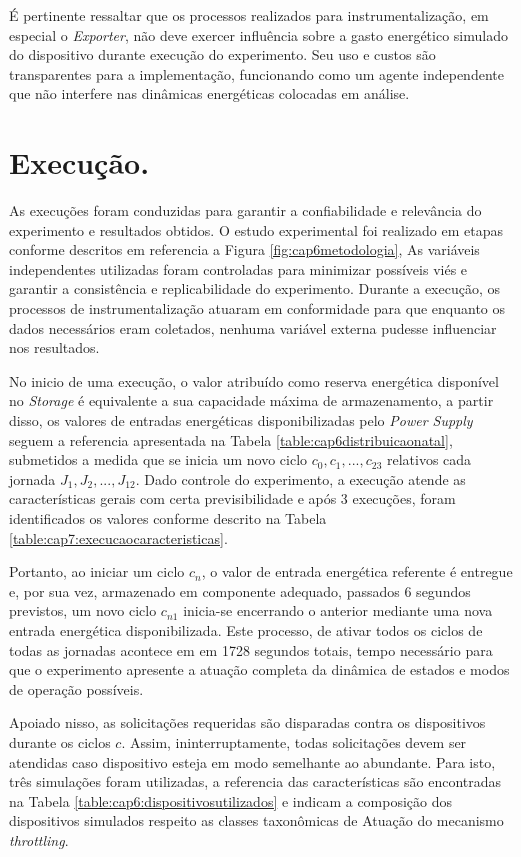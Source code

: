 É pertinente ressaltar que os processos realizados para instrumentalização, em especial o \textit{Exporter}, não deve exercer influência sobre a gasto energético simulado do dispositivo durante execução do experimento. Seu uso e custos são transparentes para a implementação, funcionando como um agente independente que não interfere nas dinâmicas energéticas colocadas em análise.

\section{Execução.}
\label{cap6:execucao}

As execuções foram conduzidas para garantir a confiabilidade e relevância do experimento e resultados obtidos. O estudo experimental foi realizado em etapas conforme descritos em referencia a Figura \ref{fig:cap6metodologia}, As variáveis independentes utilizadas foram controladas para minimizar possíveis viés e garantir a consistência e replicabilidade do experimento. Durante a execução, os processos de instrumentalização atuaram em conformidade para que enquanto os dados necessários eram coletados, nenhuma variável externa pudesse influenciar nos resultados.


No inicio de uma execução, o valor atribuído como reserva energética disponível no \textit{Storage} é equivalente a sua capacidade máxima de armazenamento, a partir disso, os valores de entradas energéticas disponibilizadas pelo \textit{Power Supply} seguem a referencia apresentada na Tabela \ref{table:cap6distribuicaonatal}, submetidos a medida que se inicia um novo ciclo $c_0, c_1,...,c_{23}$ relativos cada jornada $J_1, J_2, ..., J_{12}$. Dado controle do experimento, a execução atende as características gerais com certa previsibilidade e após 3 execuções, foram identificados os valores conforme descrito na Tabela \ref{table:cap7:execucaocaracteristicas}.


Portanto, ao iniciar um ciclo $c_n$, o valor de entrada energética referente é entregue e, por sua vez, armazenado em componente adequado, passados 6 segundos previstos, um novo ciclo $c_{n1}$ inicia-se encerrando o anterior mediante uma nova entrada energética disponibilizada. Este processo, de ativar todos os ciclos de todas as jornadas acontece em em 1728 segundos totais, tempo necessário para que o experimento apresente a atuação completa da dinâmica de estados e modos de operação possíveis.

Apoiado nisso, as solicitações requeridas são disparadas contra os dispositivos durante os ciclos $c$. Assim, ininterruptamente, todas solicitações devem ser atendidas caso dispositivo esteja em modo semelhante ao abundante. Para isto, três simulações foram utilizadas, a referencia das características são encontradas na Tabela \ref{table:cap6:dispositivosutilizados} e indicam a composição dos dispositivos simulados respeito as classes taxonômicas de Atuação do mecanismo \textit{throttling}. 


